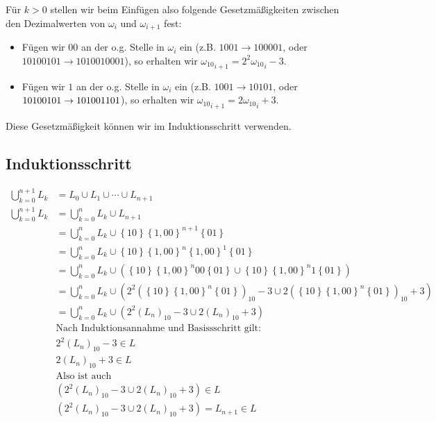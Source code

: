 \documentclass{article}
\begin{document}
Für $k > 0$ stellen wir beim Einfügen also folgende Gesetzmäßigkeiten zwischen den Dezimalwerten von $\omega_i$ und $\omega_{i+1}$ fest:
\begin{itemize}
	\item Fügen wir $00$ an der o.g. Stelle in $\omega_i$ ein (z.B. $1001 \rightarrow 100001$, oder $10100101 \rightarrow 1010010001$), so erhalten wir ${\omega_{10}}_{i+1} = 2^2 {\omega_{10}}_i - 3$.
	\item Fügen wir $1$ an der o.g. Stelle in $\omega_i$ ein (z.B. $1001 \rightarrow 10101$, oder $10100101 \\ \rightarrow 101001101$), so erhalten wir ${\omega_{10}}_{i+1} = 2 {\omega_{10}}_i + 3$.
\end{itemize}

Diese Gesetzmäßigkeit können wir im Induktionsschritt verwenden.

\subsection*{Induktionsschritt}
\begin{align*}%
\bigcup_{k=0}^{n+1} L_k &= L_0 \cup L_1 \cup \cdots \cup L_{n+1} \\
\bigcup_{k=0}^{n+1} L_k &= \bigcup_{k=0}^{n} L_k \cup L_{n+1} \\
&= \bigcup_{k=0}^{n} L_k \cup \left\{10 \right\} \left\{1,00 \right\}^{n+1} \left\{ 01 \right\} \\
&= \bigcup_{k=0}^{n} L_k \cup \left\{10 \right\} \left\{1,00 \right\}^n \left\{ 1,00 \right\}^1 \left\{ 01 \right\} \\
&= \bigcup_{k=0}^{n} L_k \cup \left( \left\{ 10 \right\} \left\{ 1,00 \right\}^n 00 \left\{ 01 \right\} \cup \left\{ 10 \right\} \left\{ 1,00 \right\}^n 1 \left\{ 01 \right\}  \right) \\
&= \bigcup_{k=0}^{n} L_k \cup \left( 2^2 \left( \left\{ 10 \right\} \left\{ 1,00 \right\}^n \left\{ 01 \right\} \right)_{10} - 3 \cup 2 \left( \left\{10\right\} \left\{1,00\right\}^n \left\{01\right\} \right)_{10} + 3 \right)\\
&= \bigcup_{k=0}^{n} L_k \cup \left( 2^2 \left( L_n \right)_{10} - 3 \cup 2 \left( L_n \right)_{10} + 3 \right) \\
&\text{Nach Induktionsannahme und Basissschritt gilt: } \\
&2^2 \left( L_n \right)_{10} - 3 \in L \\
&2 \left( L_n \right)_{10} + 3 \in L \\
&\text{Also ist auch } \\
&\left( 2^2 \left( L_n \right)_{10} - 3 \cup 2 \left( L_n \right)_{10} + 3 \right) \in L\\
&\left( 2^2 \left( L_n \right)_{10} - 3 \cup 2 \left( L_n \right)_{10} + 3 \right) = L_{n+1} \in L
\end{align*}
\end{document}
